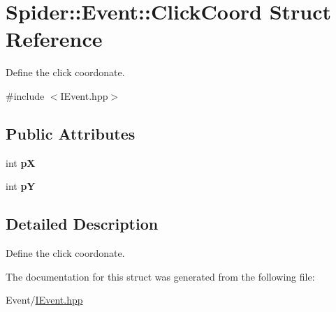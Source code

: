 \hypertarget{struct_spider_1_1_event_1_1_click_coord}{}\section{Spider\+:\+:Event\+:\+:Click\+Coord Struct Reference}
\label{struct_spider_1_1_event_1_1_click_coord}


Define the click coordonate.  




{\ttfamily \#include $<$I\+Event.\+hpp$>$}

\subsection*{Public Attributes}
\begin{DoxyCompactItemize}
\item 
\mbox{\label{struct_spider_1_1_event_1_1_click_coord_a98b23924cdaa96ba6eacefbcec193d8f}} 
int {\bfseries pX}
\item 
\mbox{\label{struct_spider_1_1_event_1_1_click_coord_ae64cc836b86d7ec976c93ca4e284ba8b}} 
int {\bfseries pY}
\end{DoxyCompactItemize}


\subsection{Detailed Description}
Define the click coordonate. 

The documentation for this struct was generated from the following file\+:\begin{DoxyCompactItemize}
\item 
Event/\hyperlink{_i_event_8hpp}{I\+Event.\+hpp}\end{DoxyCompactItemize}
